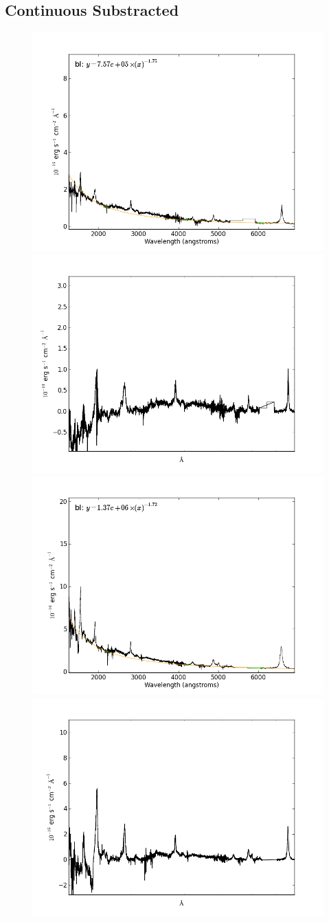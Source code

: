 \documentclass[usenatbib]{mn2e}
\begin{document}
\newpage


\subsection{Continuous Substracted}


\begin{figure}
\begin{center}
\includegraphics[width=0.46\linewidth,angle=0]{continuous_8.png}
\vspace{5mm}
\includegraphics[width=0.49\linewidth,angle=0]{no_continuous_8.png}\\
\includegraphics[width=0.46\linewidth,angle=0]{continuous_9.png}
\hspace{5mm}
\includegraphics[width=0.49\linewidth,angle=0]{no_continuous_9.png}\\

\end{center}
\end{figure}
\end{document}
